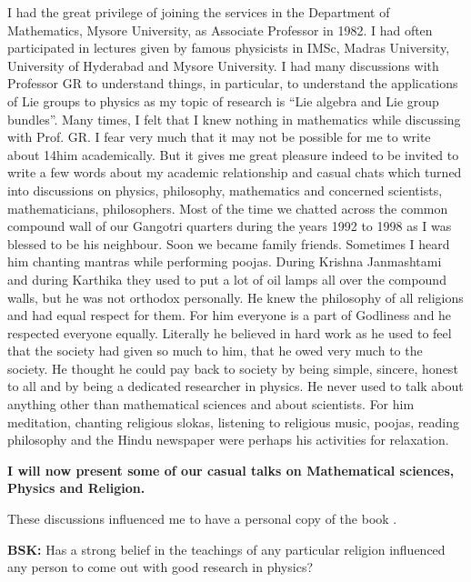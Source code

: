 I had the great privilege of joining the services in the Department of Mathematics, Mysore University, as Associate Professor in 1982. I had often participated in lectures given by famous physicists in IMSc, Madras University, University of Hyderabad and Mysore University. I had many discussions with Professor GR to understand things, in particular, to understand the applications of Lie groups to physics as my topic of research is “Lie algebra and Lie group bundles”. Many times, I felt that I knew nothing in mathematics while discussing with Prof. GR. I fear very much that it may not be possible for me to write about 14him academically. But it gives me great pleasure indeed to be invited to write a few words about my academic relationship and casual chats which turned into discussions on physics, philosophy, mathematics and concerned scientists, mathematicians, philosophers. Most of the time we chatted across the common compound wall of our Gangotri quarters during the years 1992 to 1998 as I was blessed to be his neighbour. Soon we became family friends. Sometimes I heard him chanting mantras while performing poojas. During Krishna Janmashtami and during Karthika they used to put a lot of oil lamps all over the compound walls, but he was not orthodox personally. He knew the philosophy of all religions and had equal respect for them. For him everyone is a part of Godliness and he respected everyone equally. Literally he believed in hard work as he used to feel that the society had given so much to him, that he owed very much to the society. He thought he could pay back to society by being simple, sincere, honest to all and by being a dedicated researcher in physics. He never used to talk about anything other than mathematical sciences and about scientists. For him meditation, chanting religious slokas, listening to religious music, poojas, reading philosophy and the Hindu newspaper were perhaps his activities for relaxation.

\textbf{I will now present some of our casual talks on Mathematical sciences, Physics and Religion.}

These discussions influenced me to have a personal copy of the book \cite{chap13-key04MJL}.  

\textbf{BSK:} Has a strong belief in the teachings of any particular religion influenced any person to come out with good research in physics?

